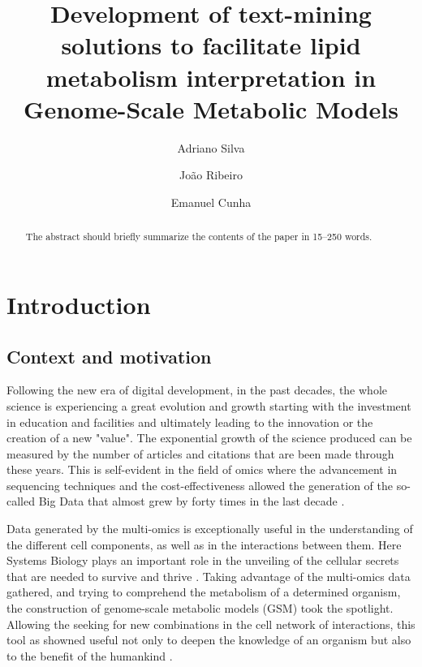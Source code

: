 \documentclass{llncs}
\begin{document}
\pagestyle{myheadings}
\title{Development of text-mining solutions to facilitate lipid metabolism interpretation in Genome-Scale Metabolic Models}

\author{Adriano Silva\and
João Ribeiro\and
Emanuel Cunha}

%
\maketitle              %
%
\begin{abstract}
The abstract should briefly summarize the contents of the paper in
15--250 words.

\end{abstract}
%
%
%
\section{Introduction}
\subsection{Context and motivation}
Following the new era of digital development, in the past decades, the whole science is experiencing a great evolution and growth starting with the investment in education and facilities and ultimately leading to the innovation or the creation of a new "value". 
The exponential growth of the science produced can be measured by the number of articles and citations that are been made through these years\cite{article1,article3}.
This is self-evident in the field of omics where the advancement in sequencing techniques and the cost-effectiveness allowed the generation of the so-called Big Data that almost grew by forty times in the last decade \cite{article3,article2}. 

Data generated by the multi-omics is exceptionally useful in the understanding of the different cell 
components, as well as in the interactions between them. Here Systems Biology plays an important 
role in the unveiling of the cellular secrets that are needed to survive and thrive \cite{article3,article4}.
Taking advantage of the multi-omics data gathered, and trying to comprehend the metabolism of a determined organism,
the construction of genome-scale metabolic models (GSM) took the spotlight. Allowing the seeking for new combinations in the cell network of interactions, this tool as showned useful not only 
to deepen the knowledge of an organism but also to the benefit of the humankind \cite{article3,article5}.
\end{document}
